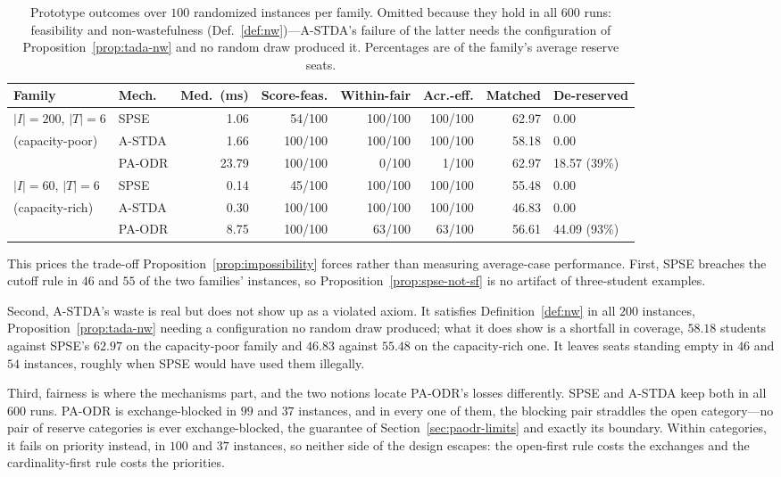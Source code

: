 \documentclass[a4paper,twoside]{article}
\theoremstyle{definition}
\begin{document}
\begin{table}[t]
\centering
\caption{Prototype outcomes over $100$ randomized instances per family. Omitted because they hold in all $600$ runs: feasibility and non-wastefulness (Def.~\ref{def:nw})---A-STDA's failure of the latter needs the configuration of Proposition~\ref{prop:tada-nw} and no random draw produced it. Percentages are of the family's average reserve seats.}
\label{tab:prototype}
\footnotesize
\setlength{\tabcolsep}{3pt}
\begin{tabular}{|L{0.14\textwidth}|L{0.08\textwidth}|r|r|r|r|r|L{0.13\textwidth}|}
\hline
Family & Mech. & Med.\ (ms) & Score-feas. & Within-fair & Acr.-eff. & Matched & De-reserved \\
\hline
$|I|=200$, $|T|=6$ & SPSE & 1.06 & 54/100 & 100/100 & 100/100 & 62.97 & 0.00 \\
(capacity-poor) & A-STDA & 1.66 & 100/100 & 100/100 & 100/100 & 58.18 & 0.00 \\
 & PA-ODR & 23.79 & 100/100 & 0/100 & 1/100 & 62.97 & 18.57 (39\%) \\
\hline
$|I|=60$, $|T|=6$ & SPSE & 0.14 & 45/100 & 100/100 & 100/100 & 55.48 & 0.00 \\
(capacity-rich) & A-STDA & 0.30 & 100/100 & 100/100 & 100/100 & 46.83 & 0.00 \\
 & PA-ODR & 8.75 & 100/100 & 63/100 & 63/100 & 56.61 & 44.09 (93\%) \\
\hline
\end{tabular}
\end{table}

This prices the trade-off Proposition~\ref{prop:impossibility} forces rather than measuring average-case performance. First, SPSE breaches the cutoff rule in $46$ and $55$ of the two families' instances, so Proposition~\ref{prop:spse-not-sf} is no artifact of three-student examples.

Second, A-STDA's waste is real but does not show up as a violated axiom. It satisfies Definition~\ref{def:nw} in all $200$ instances, Proposition~\ref{prop:tada-nw} needing a configuration no random draw produced; what it does show is a shortfall in coverage, $58.18$ students against SPSE's $62.97$ on the capacity-poor family and $46.83$ against $55.48$ on the capacity-rich one. It leaves seats standing empty in $46$ and $54$ instances, roughly when SPSE would have used them illegally.

Third, fairness is where the mechanisms part, and the two notions locate PA-ODR's losses differently. SPSE and A-STDA keep both in all $600$ runs. PA-ODR is exchange-blocked in $99$ and $37$ instances, and in every one of them, the blocking pair straddles the open category---no pair of reserve categories is ever exchange-blocked, the guarantee of Section~\ref{sec:paodr-limits} and exactly its boundary. Within categories, it fails on priority instead, in $100$ and $37$ instances, so neither side of the design escapes: the open-first rule costs the exchanges and the cardinality-first rule costs the priorities.
\end{document}
